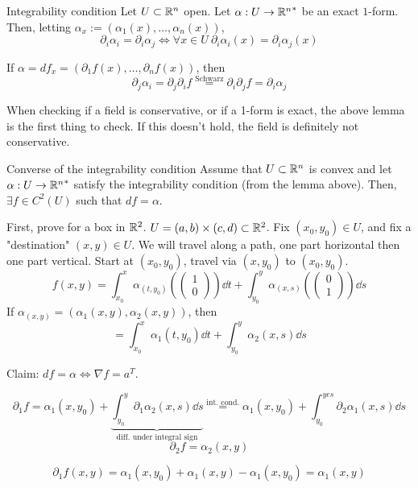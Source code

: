 \documentclass[12pt]{article}
\begin{document}
\begin{lemma}{Integrability condition}{}
    Let $U \subset \mathbb{R}^n$ open. Let $\alpha: U \rightarrow {\mathbb{R}^n}^*$ be an exact $1$-form. Then, letting $\alpha_x := (\alpha_1(x),\dots,\alpha_n(x))$,
    $$
        \partial_i \alpha_i = \partial_i \alpha_j \iff \forall x \in U\ \partial_i \alpha_i(x) = \partial_i \alpha_j(x)
    $$
\end{lemma}

\begin{proofbox}
    If $\alpha = df_x = (\partial_1f(x),\dots,\partial_nf(x))$, then
    $$
        \partial_j \alpha_i = \partial_j \partial_i f \overset{\text{Schwarz}}= \partial_i \partial_j f = \partial_i \alpha_j
    $$
\end{proofbox}

When checking if a field is conservative, or if a 1-form is exact, the above lemma is the first thing to check. If this doesn't hold, the field is definitely not conservative.

\begin{lemma}{Converse of the integrability condition}{}
    Assume that $U \subset \mathbb{R}^n$ is convex and let $\alpha: U \rightarrow {\mathbb{R}^n}^*$ satisfy the integrability condition (from the lemma above). Then, $\exists f \in C^2(U)$ such that $df = \alpha$.
\end{lemma}

\begin{proofbox}
    First, prove for a box in $\mathbb{R}^2$. $U = (a,b)\times(c, d) \subset \mathbb{R}^2$. Fix $(x_0,y_0) \in U$, and fix a "destination" $(x, y) \in U$. We will travel along a path, one part horizontal then one part vertical. Start at $(x_0,y_0)$, travel via $(x, y_0)$ to $(x_0, y_0)$.
    $$
        f(x, y) = \int_{x_0}^{x} \alpha_{(t, y_0)}\left(\begin{pmatrix} 1 \\ 0 \end{pmatrix}\right) \dd t + \int_{y_0}^{y} \alpha_{(x, s)}\left(\begin{pmatrix} 0 \\ 1 \end{pmatrix}\right) \dd s
    $$
    If $\alpha_{(x, y)} = (\alpha_1(x, y), \alpha_2(x, y))$, then
    $$
        = \int_{x_0}^{x} \alpha_1(t, y_0) \dd t + \int_{y_0}^{y} \alpha_2(x, s) \dd s
    $$

    Claim: $df = \alpha \iff \nabla f = a^T$.
    \begin{proofbox}[of claim]
        $$
            \partial_1 f = \alpha_1(x, y_0) + \underbrace{\int_{y_0}^{y} \partial_1 \alpha_2(x, s) \dd s}_{\text{diff. under integral sign}} \overset{\text{int. cond.}}= \alpha_1(x, y_0) + \int_{y_0}^{yes} \partial_2 \alpha_1(x, s) \dd s
        $$
        $$
            \partial_2 f = \alpha_2(x, y) 
        $$

        $$
            \partial_1 f(x, y) = \alpha_1(x, y_0) + \alpha_1(x, y) - \alpha_1(x, y_0) = \alpha_1(x, y)
        $$
    \end{proofbox}
\end{proofbox}
\end{document}
